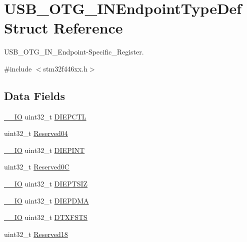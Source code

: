 \hypertarget{struct_u_s_b___o_t_g___i_n_endpoint_type_def}{}\section{U\+S\+B\+\_\+\+O\+T\+G\+\_\+\+I\+N\+Endpoint\+Type\+Def Struct Reference}
\label{struct_u_s_b___o_t_g___i_n_endpoint_type_def}


U\+S\+B\+\_\+\+O\+T\+G\+\_\+\+I\+N\+\_\+\+Endpoint-\/\+Specific\+\_\+\+Register.  




{\ttfamily \#include $<$stm32f446xx.\+h$>$}

\subsection*{Data Fields}
\begin{DoxyCompactItemize}
\item 
\mbox{\hyperlink{core__sc300_8h_aec43007d9998a0a0e01faede4133d6be}{\+\_\+\+\_\+\+IO}} uint32\+\_\+t \mbox{\hyperlink{struct_u_s_b___o_t_g___i_n_endpoint_type_def_a840b32fa57faa544c3000ae1d08564c7}{D\+I\+E\+P\+C\+TL}}
\item 
uint32\+\_\+t \mbox{\hyperlink{struct_u_s_b___o_t_g___i_n_endpoint_type_def_acfe7efaa61db86840767dff6d73f8695}{Reserved04}}
\item 
\mbox{\hyperlink{core__sc300_8h_aec43007d9998a0a0e01faede4133d6be}{\+\_\+\+\_\+\+IO}} uint32\+\_\+t \mbox{\hyperlink{struct_u_s_b___o_t_g___i_n_endpoint_type_def_a65f69561c1cefe00ce608b7a3c2d8af5}{D\+I\+E\+P\+I\+NT}}
\item 
uint32\+\_\+t \mbox{\hyperlink{struct_u_s_b___o_t_g___i_n_endpoint_type_def_a1bcc039378b4ed4ac1261a0a758c3d1d}{Reserved0C}}
\item 
\mbox{\hyperlink{core__sc300_8h_aec43007d9998a0a0e01faede4133d6be}{\+\_\+\+\_\+\+IO}} uint32\+\_\+t \mbox{\hyperlink{struct_u_s_b___o_t_g___i_n_endpoint_type_def_a19cf1f1798a062c2a19afe9224e3f938}{D\+I\+E\+P\+T\+S\+IZ}}
\item 
\mbox{\hyperlink{core__sc300_8h_aec43007d9998a0a0e01faede4133d6be}{\+\_\+\+\_\+\+IO}} uint32\+\_\+t \mbox{\hyperlink{struct_u_s_b___o_t_g___i_n_endpoint_type_def_a05fcc63652e936e715223e4423069959}{D\+I\+E\+P\+D\+MA}}
\item 
\mbox{\hyperlink{core__sc300_8h_aec43007d9998a0a0e01faede4133d6be}{\+\_\+\+\_\+\+IO}} uint32\+\_\+t \mbox{\hyperlink{struct_u_s_b___o_t_g___i_n_endpoint_type_def_a44135a03aa87fb60abd479a09f71343d}{D\+T\+X\+F\+S\+TS}}
\item 
uint32\+\_\+t \mbox{\hyperlink{struct_u_s_b___o_t_g___i_n_endpoint_type_def_a716e172ed03ae049eb501ad83207b4ed}{Reserved18}}
\end{DoxyCompactItemize}


